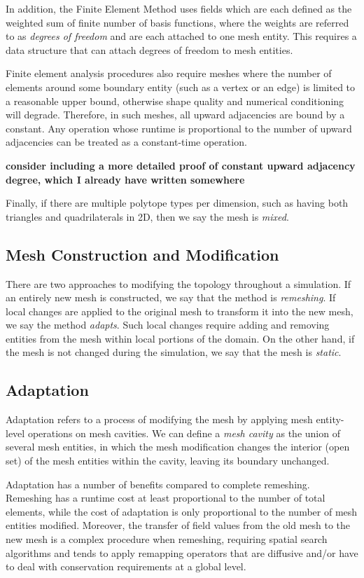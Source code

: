 In addition, the Finite Element Method uses fields which are each defined
as the weighted sum of finite number of basis functions,
where the weights are referred to as \emph{degrees of freedom} and are each
attached to one mesh entity.
This requires a data structure that can attach
degrees of freedom to mesh entities.

Finite element analysis procedures also require meshes where
the number of elements around some boundary entity (such as a vertex
or an edge) is limited to a reasonable upper bound,
otherwise shape quality and numerical conditioning will degrade.
Therefore, in such meshes, all upward adjacencies are bound
by a constant.
Any operation whose runtime is proportional to the
number of upward adjacencies can be treated as a constant-time operation.

{\bf consider including a more detailed proof of constant upward
adjacency degree, which I already have written somewhere}

Finally, if there are multiple polytope types per dimension,
such as having both triangles and quadrilaterals in 2D, then
we say the mesh is {\it mixed}.

\subsection{Mesh Construction and Modification}

There are two approaches to modifying the topology throughout
a simulation.
If an entirely new mesh is constructed, we say that the
method is {\it remeshing}.
If local changes are applied to the original mesh to transform
it into the new mesh, we say the method {\it adapts}.
Such local changes require adding and removing entities
from the mesh within local portions of the domain.
On the other hand, if the mesh is not changed during the
simulation, we say that the mesh is {\it static}.

\subsection{Adaptation}
\label{sec:def_adapt}

Adaptation refers to a process of modifying the mesh by applying
mesh entity-level operations on mesh cavities.
We can define a {\it mesh cavity} as the
union of several mesh entities, in which the
mesh modification changes the interior (open set) of
the mesh entities within the cavity, leaving its boundary unchanged.

Adaptation has a number of benefits compared to complete remeshing.
Remeshing has a runtime cost at least proportional to the number
of total elements, while the cost of adaptation is only proportional
to the number of mesh entities modified.
Moreover, the transfer of field values from the old mesh
to the new mesh is a complex procedure when remeshing,
requiring spatial search algorithms and
tends to apply remapping operators that are diffusive and/or
have to deal with conservation requirements at a global level.

